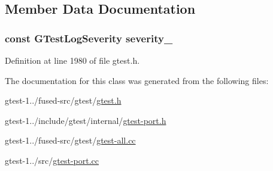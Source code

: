 \subsection{\-Member \-Data \-Documentation}
\hypertarget{classtesting_1_1internal_1_1GTestLog_a6c8b1af920457ac4f42706bbd995100b}{
\subsubsection[{severity\-\_\-}]{\setlength{\rightskip}{0pt plus 5cm}const {\bf \-G\-Test\-Log\-Severity} {\bf severity\-\_\-}}}\label{da/d59/classtesting_1_1internal_1_1GTestLog_a6c8b1af920457ac4f42706bbd995100b}


\-Definition at line 1980 of file gtest.\-h.



\-The documentation for this class was generated from the following files\-:\begin{DoxyCompactItemize}
\item 
gtest-\/1../fused-\/src/gtest/\hyperlink{fused-src_2gtest_2gtest_8h}{gtest.\-h}\item 
gtest-\/1../include/gtest/internal/\hyperlink{gtest-port_8h}{gtest-\/port.\-h}\item 
gtest-\/1../fused-\/src/gtest/\hyperlink{fused-src_2gtest_2gtest-all_8cc}{gtest-\/all.\-cc}\item 
gtest-\/1../src/\hyperlink{gtest-port_8cc}{gtest-\/port.\-cc}\end{DoxyCompactItemize}
